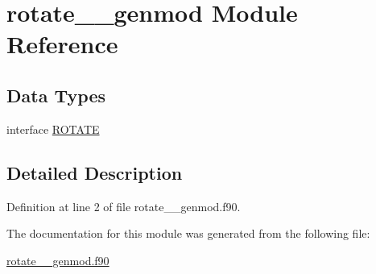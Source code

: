 \hypertarget{classrotate____genmod}{\section{rotate\+\_\+\+\_\+genmod Module Reference}
\label{classrotate____genmod}
}
\subsection*{Data Types}
\begin{DoxyCompactItemize}
\item 
interface \hyperlink{interfacerotate____genmod_1_1ROTATE}{R\+O\+T\+A\+T\+E}
\end{DoxyCompactItemize}


\subsection{Detailed Description}


Definition at line 2 of file rotate\+\_\+\+\_\+genmod.\+f90.



The documentation for this module was generated from the following file\+:\begin{DoxyCompactItemize}
\item 
\hyperlink{rotate____genmod_8f90}{rotate\+\_\+\+\_\+genmod.\+f90}\end{DoxyCompactItemize}
